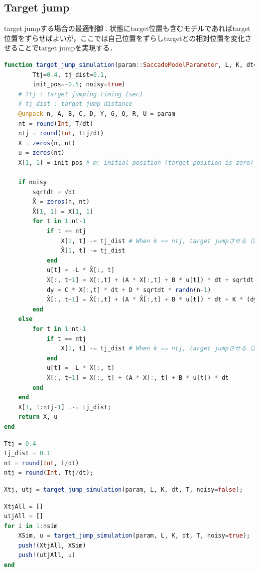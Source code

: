\subsection{Target jump}
target jumpする場合の最適制御 \citep{Li2018-qt}. 状態にtarget位置も含むモデルであればtarget位置をずらせばよいが，ここでは自己位置をずらしtargetとの相対位置を変化させることでtarget jumpを実現する．
\begin{lstlisting}[language=julia]
function target_jump_simulation(param::SaccadeModelParameter, L, K, dt=0.001, T=2.0, 
        Ttj=0.4, tj_dist=0.1, 
        init_pos=-0.5; noisy=true)
    # Ttj : target jumping timing (sec)
    # tj_dist : target jump distance
    @unpack n, A, B, C, D, Y, G, Q, R, U = param
    nt = round(Int, T/dt)
    ntj = round(Int, Ttj/dt)
    X = zeros(n, nt)
    u = zeros(nt)
    X[1, 1] = init_pos # m; initial position (target position is zero)

    if noisy
        sqrtdt = √dt
        X̂ = zeros(n, nt)
        X̂[1, 1] = X[1, 1]
        for t in 1:nt-1
            if t == ntj
                X[1, t] -= tj_dist # When k == ntj, target jumpさせる（実際には現在の位置をずらす）
                X̂[1, t] -= tj_dist
            end
            u[t] = -L * X̂[:, t]
            X[:, t+1] = X[:,t] + (A * X[:,t] + B * u[t]) * dt + sqrtdt * (Y * u[t] * randn() + G * randn(n))
            dy = C * X[:,t] * dt + D * sqrtdt * randn(n-1)
            X̂[:, t+1] = X̂[:,t] + (A * X̂[:,t] + B * u[t]) * dt + K * (dy - C * X̂[:,t] * dt)
        end
    else
        for t in 1:nt-1
            if t == ntj
                X[1, t] -= tj_dist # When k == ntj, target jumpさせる（実際には現在の位置をずらす）
            end
            u[t] = -L * X[:, t]
            X[:, t+1] = X[:, t] + (A * X[:, t] + B * u[t]) * dt
        end
    end
    X[1, 1:ntj-1] .-= tj_dist;
    return X, u
end
\end{lstlisting}
\begin{lstlisting}[language=julia]
Ttj = 0.4
tj_dist = 0.1
nt = round(Int, T/dt)
ntj = round(Int, Ttj/dt);
\end{lstlisting}
\begin{lstlisting}[language=julia]
Xtj, utj = target_jump_simulation(param, L, K, dt, T, noisy=false);
\end{lstlisting}
\begin{lstlisting}[language=julia]
XtjAll = []
utjAll = []
for i in 1:nsim
    XSim, u = target_jump_simulation(param, L, K, dt, T, noisy=true);
    push!(XtjAll, XSim)
    push!(utjAll, u)
end
\end{lstlisting}
